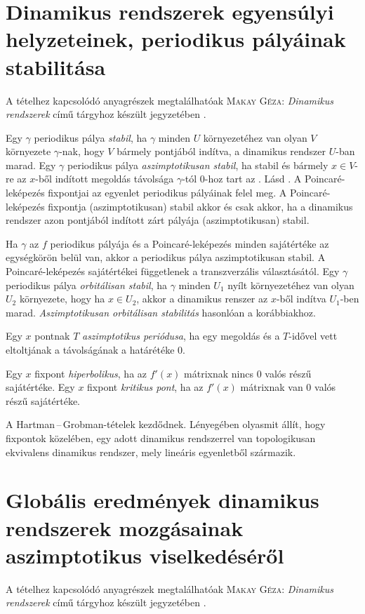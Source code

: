 \documentclass[%
	DIV=15,appendixprefix]{scrreprt}
\theoremstyle{definition}
\theoremstyle{remark}
\begin{document}
\section{Dinamikus rendszerek egyensúlyi helyzeteinek, periodikus pályáinak stabilitása}
A tételhez kapcsolódó anyagrészek megtalálhatóak \textsc{Makay Géza}:
\emph{Dinamikus rendszerek} című tárgyhoz készült jegyzetében \cite{Makay}.

Egy $\gamma$ periodikus pálya \emph{stabil}, ha $\gamma$ minden $U$ környezetéhez van olyan $V$
környezete $\gamma$-nak, hogy $V$ bármely pontjából indítva, a dinamikus rendszer $U$-ban marad. Egy
$\gamma$ periodikus pálya \emph{aszimptotikusan stabil}, ha stabil és bármely $x\in V$-re az
$ x $-ből indított megoldás távolsága $ \gamma $-tól 0-hoz tart az .
%
Lásd \cite[33--34.~oldal]{Makay}.
A Poincaré-leképezés fixpontjai az egyenlet periodikus pályáinak felel meg. A Poincaré-leképezés
fixpontja (aszimptotikusan) stabil akkor és csak akkor, ha a dinamikus rendszer azon pontjából
indított zárt pályája (aszimptotikusan) stabil.

Ha $\gamma$ az $f$ periodikus pályája és a Poincaré-leképezés minden sajátértéke az egységkörön
belül van, akkor a periodikus pálya aszimptotikusan stabil. A Poincaré-leképezés sajátértékei
függetlenek a transzverzális választásától.
%
Egy $\gamma$ periodikus pálya \emph{orbitálisan stabil}, ha $\gamma$ minden $ U_1 $ nyílt
környezetéhez van olyan $ U_2 $ környezete, hogy ha $x\in U_2$, akkor a dinamikus renszer az $x$-ből
indítva $U_1$-ben marad. \emph{Aszimptotikusan orbitálisan stabilitás} hasonlóan a korábbiakhoz.

Egy $x$ pontnak $T$ \emph{aszimptotikus periódusa}, ha egy megoldás és a $T$-idővel vett eltoltjának
a távolságának a határétéke 0.

Egy $x$ fixpont \emph{hiperbolikus}, ha az $f'\left( x \right) $ mátrixnak nincs 0 valós részű
sajátértéke. Egy $x$ fixpont \emph{kritikus pont}, ha az $ f' \left( x \right)  $ mátrixnak van 0
valós részű sajátértéke.

A Hartman\,--\,Grobman-tételek \cite[52.~oldalától]{Makay} kezdődnek. Lényegében olyasmit állít,
hogy fixpontok közelében, egy adott dinamikus rendszerrel van topologikusan ekvivalens dinamikus
rendszer, mely lineáris egyenletből származik.
\section{Globális eredmények dinamikus rendszerek mozgásainak aszimptotikus viselkedéséről}
%
A tételhez kapcsolódó anyagrészek megtalálhatóak \textsc{Makay Géza}:
\emph{Dinamikus rendszerek} című tárgyhoz készült jegyzetében \cite{Makay}.
\end{document}
